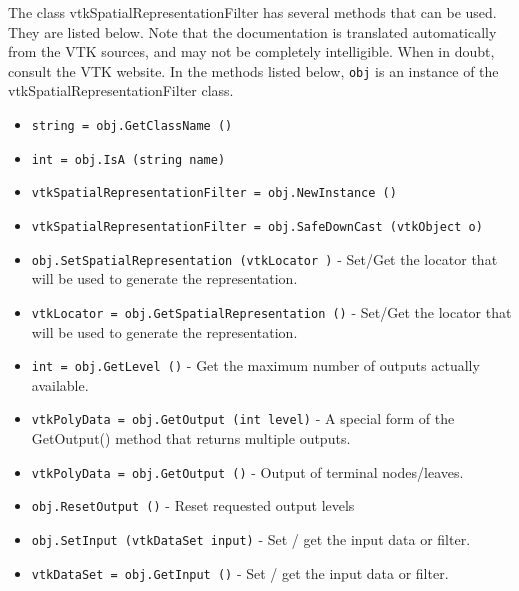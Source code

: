 The class vtkSpatialRepresentationFilter has several methods that can be used.
  They are listed below.
Note that the documentation is translated automatically from the VTK sources,
and may not be completely intelligible.  When in doubt, consult the VTK website.
In the methods listed below, \verb|obj| is an instance of the vtkSpatialRepresentationFilter class.
\begin{itemize}
\item  \verb|string = obj.GetClassName ()|

\item  \verb|int = obj.IsA (string name)|

\item  \verb|vtkSpatialRepresentationFilter = obj.NewInstance ()|

\item  \verb|vtkSpatialRepresentationFilter = obj.SafeDownCast (vtkObject o)|

\item  \verb|obj.SetSpatialRepresentation (vtkLocator )| -  Set/Get the locator that will be used to generate the representation.

\item  \verb|vtkLocator = obj.GetSpatialRepresentation ()| -  Set/Get the locator that will be used to generate the representation.

\item  \verb|int = obj.GetLevel ()| -  Get the maximum number of outputs actually available.

\item  \verb|vtkPolyData = obj.GetOutput (int level)| -  A special form of the GetOutput() method that returns multiple outputs.

\item  \verb|vtkPolyData = obj.GetOutput ()| -  Output of terminal nodes/leaves.

\item  \verb|obj.ResetOutput ()| -  Reset requested output levels

\item  \verb|obj.SetInput (vtkDataSet input)| -  Set / get the input data or filter.

\item  \verb|vtkDataSet = obj.GetInput ()| -  Set / get the input data or filter.

\end{itemize}

